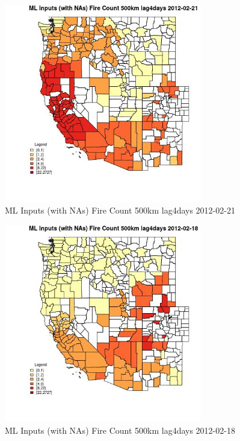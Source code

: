 \begin{figure} 
\centering  
\includegraphics[width=0.77\textwidth]{Code_Outputs/Report_ML_input_PM25_Step4_part_f_de_duplicated_aveswNAs_CountyFire_Count_500km_lag4daysMean2012-02-21.jpg} 
\caption{\label{fig:Report_ML_input_PM25_Step4_part_f_de_duplicated_aveswNAsCountyFire_Count_500km_lag4daysMean2012-02-21}ML Inputs (with NAs) Fire Count 500km lag4days 2012-02-21} 
\end{figure} 
 

\begin{figure} 
\centering  
\includegraphics[width=0.77\textwidth]{Code_Outputs/Report_ML_input_PM25_Step4_part_f_de_duplicated_aveswNAs_CountyFire_Count_500km_lag4daysMean2012-02-18.jpg} 
\caption{\label{fig:Report_ML_input_PM25_Step4_part_f_de_duplicated_aveswNAsCountyFire_Count_500km_lag4daysMean2012-02-18}ML Inputs (with NAs) Fire Count 500km lag4days 2012-02-18} 
\end{figure} 
 

